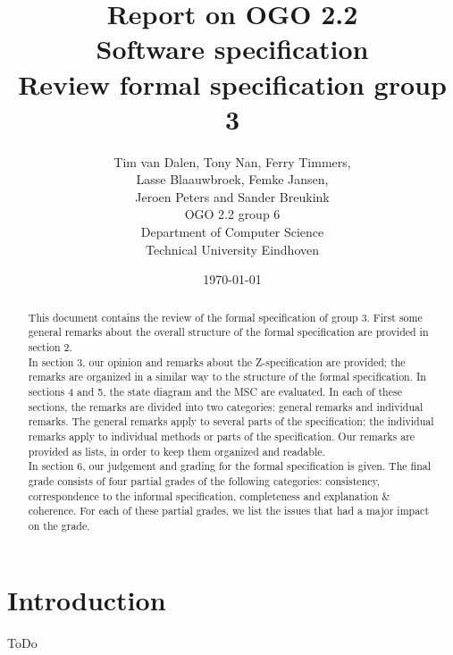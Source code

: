 \documentclass[a4paper,11pt]{article}
\title{Report on OGO 2.2 \\ Software specification\\ Review formal specification group 3}
\author{
        Tim van Dalen, Tony Nan, Ferry Timmers, \\ Lasse Blaauwbroek, Femke Jansen, \\Jeroen Peters and Sander Breukink\\ OGO 2.2 group 6 \\
                Department of Computer Science\\
        Technical University Eindhoven\\
}
\date{\today}
\begin{document}
\maketitle

\begin{abstract}
This document contains the review of the formal specification of group 3. First some general remarks about the overall structure of the formal specification are provided in section 2. \\
In section 3, our opinion and remarks about the Z-specification are provided; the remarks are organized in a similar way to the structure of the formal specification. In sections 4 and 5, the state diagram and the MSC are evaluated. In each of these sections, the remarks are divided into two categories: general remarks and individual remarks. The general remarks apply to several parts of the specification; the individual remarks apply to individual methods or parts of the specification. Our remarks are provided as lists, in order to keep them organized and readable. \\
In section 6, our judgement and grading for the formal specification is given. The final grade consists of four partial grades of the following categories: consistency, correspondence to the informal specification, completeness and explanation \& coherence. For each of these partial grades, we list the issues that had a major impact on the grade.
\end{abstract}

\newpage
	
	\tableofcontents
	\newpage

    \section{Introduction}
    ToDo
\end{document}
